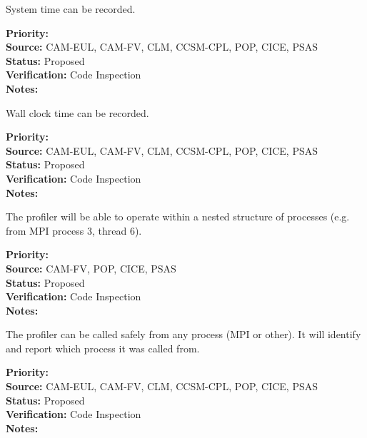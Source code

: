 
System time can be recorded.

\begin{reqlist}
{\bf Priority:}  \\
{\bf Source:} CAM-EUL, CAM-FV, CLM, CCSM-CPL, POP, CICE, PSAS \\
{\bf Status:} Proposed \\
{\bf Verification:} Code Inspection \\
{\bf Notes:} 
\end{reqlist}



Wall clock time can be recorded.

\begin{reqlist}
{\bf Priority:}  \\
{\bf Source:} CAM-EUL, CAM-FV, CLM, CCSM-CPL, POP, CICE, PSAS \\
{\bf Status:} Proposed \\
{\bf Verification:} Code Inspection \\
{\bf Notes:} 
\end{reqlist}


The profiler will be able to operate within a nested structure of processes (e.g.
from MPI process 3, thread 6).

\begin{reqlist}
{\bf Priority:}  \\
{\bf Source:}  CAM-FV, POP, CICE, PSAS \\
{\bf Status:} Proposed \\
{\bf Verification:} Code Inspection \\
{\bf Notes:} 
\end{reqlist}


The profiler can be called safely from any process (MPI or other).  It will 
identify and report which process it was called from.

\begin{reqlist}
{\bf Priority:}  \\
{\bf Source:} CAM-EUL, CAM-FV, CLM, CCSM-CPL, POP, CICE, PSAS \\
{\bf Status:} Proposed \\
{\bf Verification:} Code Inspection \\
{\bf Notes:} 
\end{reqlist}


